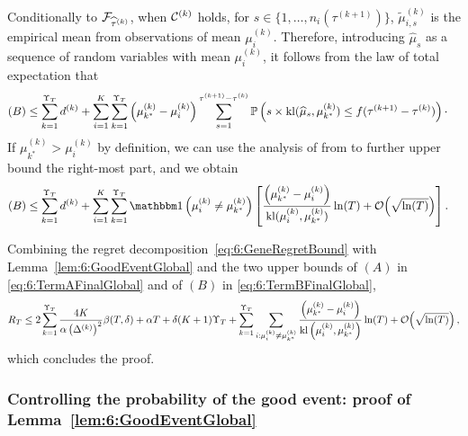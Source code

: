 Conditionally to $\mathcal{F}_{\widehat{\tau}^{(k)}}$, when $\mathcal{C}^{(k)}$ holds, for $s \in \{1, \ldots, n_i(\tau^{(k+1)})\}$, $\tilde{\mu}_{i,s}^{(k)}$ is the empirical mean from \iid{} observations of mean $\mu_i^{(k)}$.
Therefore, introducing $\widehat{\mu}_s$ as a sequence of \iid{} random variables with mean $\mu_i^{(k)}$, it follows from the law of total expectation that
\begin{align*}
    (B)& \leq \sum_{k=1}^{\Upsilon_T}d^{(k)}+\sum_{i=1}^K\sum_{k=1}^{\Upsilon_T}\left(\mu_{k^*}^{(k)} - \mu_{i}^{(k)}\right) \sum_{s=1}^{\tau^{(k+1)}-\tau^{(k)}}\mathbb{P}\left(s \times \mathrm{kl}(\widehat{\mu}_{s}, \mu_{k^*}^{(k)}) \leq f(\tau^{(k+1)} - \tau^{(k)})\right)\cdot
\end{align*}
%
If $\mu_{k^*}^{(k)} > \mu_i^{(k)}$ by definition, we can use the analysis of \klUCB{} from \cite{KLUCBJournal} to further upper bound the right-most part, and we obtain
%
\begin{align}\label{eq:6:TermBFinalGlobal}
    (B) & \leq \sum_{k=1}^{\Upsilon_T}d^{(k)}+\sum_{i=1}^K\sum_{k=1}^{\Upsilon_T}\indic\left(\mu_i^{(k)} \neq \mu_{k^*}^{(k)}\right)\left[ \frac{\left(\mu_{k^*}^{(k)} - \mu_{i}^{(k)}\right)}{\kl(\mu_i^{(k)},\mu_{k^*}^{(k)})}\log(T) + \bigO{\sqrt{\log(T)}}\right].
\end{align}

Combining the regret decomposition~\eqref{eq:6:GeneRegretBound} with Lemma~\ref{lem:6:GoodEventGlobal} and the two upper bounds of $(A)$ in \eqref{eq:6:TermAFinalGlobal} and of $(B)$ in \eqref{eq:6:TermBFinalGlobal},
\[R_T \leq 2\sum_{k=1}^{\Upsilon_T} \frac{4K}{\alpha \left(\Delta^{(k)}\right)^2}\beta(T,\delta) +\alpha T + \delta (K+1)\Upsilon_T  + \sum_{k=1}^{\Upsilon_T}\sum_{i : \mu_i^{(k)} \neq \mu_{k^*}^{(k)}} \frac{\left( \mu_{k^*}^{(k)}-\mu_i^{(k)}\right)}{\mathrm{kl}\left(\mu_i^{(k)},\mu_{k^*}^{(k)}\right)}\ln(T) + \mathop{}\mathopen{}\mathcal{O}\mathopen{}\left(\sqrt{\ln(T)}\right),\]
which concludes the proof.


\subsubsection{Controlling the probability of the good event: proof of Lemma~\ref{lem:6:GoodEventGlobal}}


